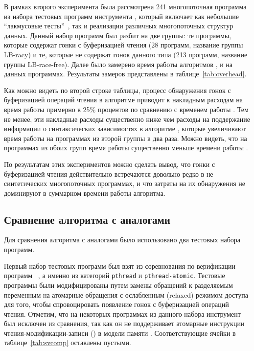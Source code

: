В рамках второго эксперимента была рассмотрена 241 многопоточная программа 
из набора тестовых программ инструмента \genmc, 
который включает как небольшие ``лакмусовые тесты''~\cite{Alglave-al:TACAS2011}, 
так и реализации различных многопоточных структур данных.
Данный набор программ был разбит на две группы:
те программы, которые содержат гонки с буферизацией чтения 
(28 программ, название группы LB-racy)
и те, которые не содержат гонок данного типа 
(213 программ, название группы LB-race-free).
Далее было замерено время работы алгоритмов \genmc, \hmc и \wmc на данных программах.  
Результаты замеров представлены в таблице~\ref{tab:overhead}.



Как можно видеть по второй строке таблицы, 
процесс обнаружения гонок с буферизацией операций чтения 
в алгоритме \wmc приводит к накладным расходам на время работы 
примерно в 25\% процентов по сравнению с временем работы \genmc.
Тем не менее, эти накладные расходы существенно ниже чем 
расходы на поддержание информации о синтаксических зависимостях
в алгоритме \hmc, которые увеличивают время работы \hmc
на программах из второй группы в два раза.  
Можно видеть, что на программах из обоих групп
время работы \wmc существенно меньше времени работы \hmc. 

По результатам этих экспериментов можно сделать вывод, 
что гонки с буферизацией чтения действительно встречаются 
довольно редко в не синтетических многопоточных программах, 
и что затраты на их обнаружения не доминируют 
в суммарном времени работы алгоритма.



\subsection*{Сравнение алгоритма \wmc с аналогами}

Для сравнения алгоритма \wmc с аналогами было использовано 
два тестовых набора программ.

Первый набор тестовых программ был взят 
из соревнования по верификации программ \SVCOMP~\cite{SVCOMP}, 
а именно из категорий \texttt{pthread} и \texttt{pthread-atomic}.
Тестовые программы были модифицированы путем замены 
обращений к разделяемым переменным на атомарные обращения 
с ослабленным (relaxed) режимом доступа 
для того, чтобы спровоцировать появление гонок 
с буферизацией операций чтения. 
Отметим, что на некоторых программах из данного набора 
инструмент \Nidhugg был исключен из сравнения, так как он не поддерживает 
атомарные инструкции чтения-модификации-записи (\RMW) в модели памяти \POWER. 
Соответствующие ячейки в таблице~\ref{tab:svcomp} оставлены пустыми.

